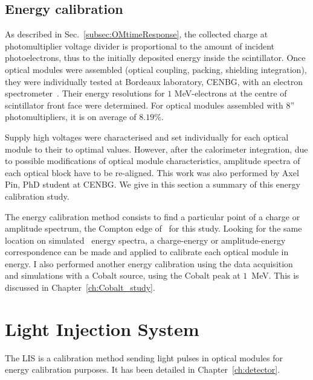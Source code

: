 \subsection{Energy calibration}
\label{sec:comm_energy_calibration}

As described in Sec.~\ref{subsec:OMtimeResponse}, the collected charge at photomultiplier voltage divider is proportional to the amount of incident photoelectrons, thus to the initially deposited energy inside the scintillator.
Once optical modules were assembled (optical coupling, packing, shielding integration), they were individually tested at Bordeaux laboratory, CENBG, with an electron spectrometer~\cite{HuberThesis}.
Their energy resolutions for $1$ MeV-electrons at the centre of scintillator front face were determined.
For optical modules assembled with $8$'' photomultipliers, it is on average of $8.19$\%.

Supply high voltages were characterised and set individually for each optical module to their to optimal values.
However, after the calorimeter integration, due to possible modifications of optical module characteristics, amplitude spectra of each optical block have to be re-aligned.
This work was also performed by Axel Pin, PhD student at CENBG.
We give in this section a summary of this energy calibration study.

The energy calibration method consists to find a particular point of a charge or amplitude spectrum, the Compton edge of \Tl\ for this study.
Looking for the same location on simulated \Tl\ energy spectra, a charge-energy or amplitude-energy correspondence can be made and applied to calibrate each optical module in energy.
I also performed another energy calibration using the data acquisition and simulations with a Cobalt source, using the Cobalt peak at $1$~MeV.
This is discussed in Chapter~\ref{ch:Cobalt_study}.


\section{Light Injection System}
\label{sec:LI}

The LIS is a calibration method sending light pulses in optical modules for energy calibration purposes.
It has been detailed in Chapter~\ref{ch:detector}.

